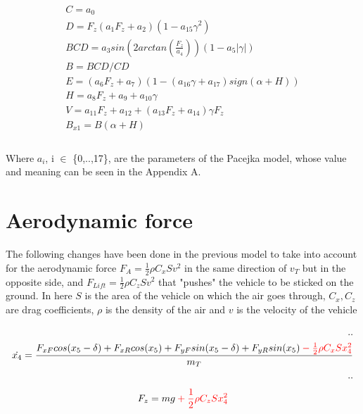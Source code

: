 \documentclass{report}
\let\Oldsection\section
\renewcommand{\section}{\FloatBarrier\Oldsection}
\begin{document}
\begin{equation}
\begin{aligned}
C = a_0\\
D = F_z (a_1 F_z + a_2) (1 - a_{15} \gamma^2)\\
BCD = a_3 sin (2 arctan(\frac{F_z}{a_4})) (1 - a_5 |\gamma|)\\
B = BCD / CD\\
E = (a_6 F_z + a_7) (1 - (a_{16} \gamma + a_{17})sign(\alpha+H))\\
H = a_8 F_z + a_9 + a_{10} \gamma\\
V = a_{11}F_z + a_{12} + (a_{13} F_z + a_{14}) \gamma F_z\\
B_{x1} = B (\alpha + H)\\\\
\end{aligned}
\end{equation}

Where $a_i$, i $\in$ \{0,..,17\}, are the parameters of the Pacejka model, whose value and meaning can be seen in the Appendix A.

\section{Aerodynamic force}

The \color{red} following \color{black} changes have been done in the previous model to take into account for the aerodynamic force $F_A = \frac{1}{2} \rho C_x S v^2$ in the same direction of $v_T$ but in the opposite side, and $F_{Lift} = \frac{1}{2} \rho C_z S v^2$ that "pushes" the vehicle to be sticked on the ground. In here $S$ is the area of the vehicle on which the air goes through, $C_x, C_z$ are drag coefficients, $\rho$ is the density of the air and $v$ is the velocity of the vehicle

\begin{equation}
\begin{aligned}
..\\
\dot{x_4} = \frac{F_{xF} cos(x_5-\delta) + F_{xR} cos(x_5) + F_{yF} sin(x_5-\delta) + F_{yR} sin(x_5) \color{red} -\frac{1}{2} \rho C_x S x_{4}^2 \color{black}}{m_T} \\
..\\
\end{aligned}
\end{equation}
\begin{equation}
\begin{aligned}
F_z = mg \color{red} + \frac{1}{2} \rho C_z S x_{4}^2 \color{black} \\\\
\end{aligned}
\end{equation}
\end{document}
